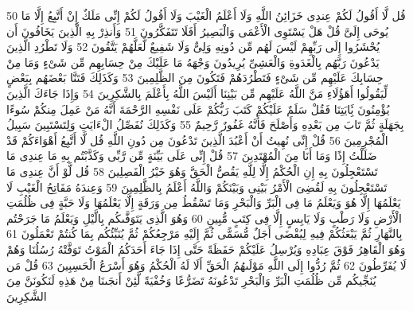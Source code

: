 {\tiny\colorbox{cl_aya}{50}} قُل لَّا أَقُولُ لَكُمْ عِندِى خَزَائِنُ اللَّهِ وَلَا أَعْلَمُ الْغَيْبَ وَلَا أَقُولُ لَكُمْ إِنِّى مَلَكٌ إِنْ أَتَّبِعُ إِلَّا مَا يُوحَى إِلَىَّ قُلْ هَلْ يَسْتَوِى الْأَعْمَى وَالْبَصِيرُ أَفَلَا تَتَفَكَّرُونَ
{\tiny\colorbox{cl_aya}{51}} وَأَنذِرْ بِهِ الَّذِينَ يَخَافُونَ أَن يُحْشَرُوا إِلَى رَبِّهِمْ لَيْسَ لَهُم مِّن دُونِهِ وَلِىٌّ وَلَا شَفِيعٌ لَّعَلَّهُمْ يَتَّقُونَ
{\tiny\colorbox{cl_aya}{52}} وَلَا تَطْرُدِ الَّذِينَ يَدْعُونَ رَبَّهُم بِالْغَدَوةِ وَالْعَشِىِّ يُرِيدُونَ وَجْهَهُ مَا عَلَيْكَ مِنْ حِسَابِهِم مِّن شَىْءٍ وَمَا مِنْ حِسَابِكَ عَلَيْهِم مِّن شَىْءٍ فَتَطْرُدَهُمْ فَتَكُونَ مِنَ الظَّلِمِينَ
{\tiny\colorbox{cl_aya}{53}} وَكَذَلِكَ فَتَنَّا بَعْضَهُم بِبَعْضٍ لِّيَقُولُوا أَهَؤُلَاءِ مَنَّ اللَّهُ عَلَيْهِم مِّن بَيْنِنَا أَلَيْسَ اللَّهُ بِأَعْلَمَ بِالشَّكِرِينَ
{\tiny\colorbox{cl_aya}{54}} وَإِذَا جَاءَكَ الَّذِينَ يُؤْمِنُونَ بَِٔايَتِنَا فَقُلْ سَلَمٌ عَلَيْكُمْ كَتَبَ رَبُّكُمْ عَلَى نَفْسِهِ الرَّحْمَةَ أَنَّهُ مَنْ عَمِلَ مِنكُمْ سُوءًا بِجَهَلَةٍ ثُمَّ تَابَ مِن بَعْدِهِ وَأَصْلَحَ فَأَنَّهُ غَفُورٌ رَّحِيمٌ
{\tiny\colorbox{cl_aya}{55}} وَكَذَلِكَ نُفَصِّلُ الْءَايَتِ وَلِتَسْتَبِينَ سَبِيلُ الْمُجْرِمِينَ
{\tiny\colorbox{cl_aya}{56}} قُلْ إِنِّى نُهِيتُ أَنْ أَعْبُدَ الَّذِينَ تَدْعُونَ مِن دُونِ اللَّهِ قُل لَّا أَتَّبِعُ أَهْوَاءَكُمْ قَدْ ضَلَلْتُ إِذًا وَمَا أَنَا مِنَ الْمُهْتَدِينَ
{\tiny\colorbox{cl_aya}{57}} قُلْ إِنِّى عَلَى بَيِّنَةٍ مِّن رَّبِّى وَكَذَّبْتُم بِهِ مَا عِندِى مَا تَسْتَعْجِلُونَ بِهِ إِنِ الْحُكْمُ إِلَّا لِلَّهِ يَقُصُّ الْحَقَّ وَهُوَ خَيْرُ الْفَصِلِينَ
{\tiny\colorbox{cl_aya}{58}} قُل لَّوْ أَنَّ عِندِى مَا تَسْتَعْجِلُونَ بِهِ لَقُضِىَ الْأَمْرُ بَيْنِى وَبَيْنَكُمْ وَاللَّهُ أَعْلَمُ بِالظَّلِمِينَ
{\tiny\colorbox{cl_aya}{59}} وَعِندَهُ مَفَاتِحُ الْغَيْبِ لَا يَعْلَمُهَا إِلَّا هُوَ وَيَعْلَمُ مَا فِى الْبَرِّ وَالْبَحْرِ وَمَا تَسْقُطُ مِن وَرَقَةٍ إِلَّا يَعْلَمُهَا وَلَا حَبَّةٍ فِى ظُلُمَتِ الْأَرْضِ وَلَا رَطْبٍ وَلَا يَابِسٍ إِلَّا فِى كِتَبٍ مُّبِينٍ
{\tiny\colorbox{cl_aya}{60}} وَهُوَ الَّذِى يَتَوَفَّىكُم بِالَّيْلِ وَيَعْلَمُ مَا جَرَحْتُم بِالنَّهَارِ ثُمَّ يَبْعَثُكُمْ فِيهِ لِيُقْضَى أَجَلٌ مُّسَمًّى ثُمَّ إِلَيْهِ مَرْجِعُكُمْ ثُمَّ يُنَبِّئُكُم بِمَا كُنتُمْ تَعْمَلُونَ
{\tiny\colorbox{cl_aya}{61}} وَهُوَ الْقَاهِرُ فَوْقَ عِبَادِهِ وَيُرْسِلُ عَلَيْكُمْ حَفَظَةً حَتَّى إِذَا جَاءَ أَحَدَكُمُ الْمَوْتُ تَوَفَّتْهُ رُسُلُنَا وَهُمْ لَا يُفَرِّطُونَ
{\tiny\colorbox{cl_aya}{62}} ثُمَّ رُدُّوا إِلَى اللَّهِ مَوْلَىهُمُ الْحَقِّ أَلَا لَهُ الْحُكْمُ وَهُوَ أَسْرَعُ الْحَسِبِينَ
{\tiny\colorbox{cl_aya}{63}} قُلْ مَن يُنَجِّيكُم مِّن ظُلُمَتِ الْبَرِّ وَالْبَحْرِ تَدْعُونَهُ تَضَرُّعًا وَخُفْيَةً لَّئِنْ أَنجَىنَا مِنْ هَذِهِ لَنَكُونَنَّ مِنَ الشَّكِرِينَ
